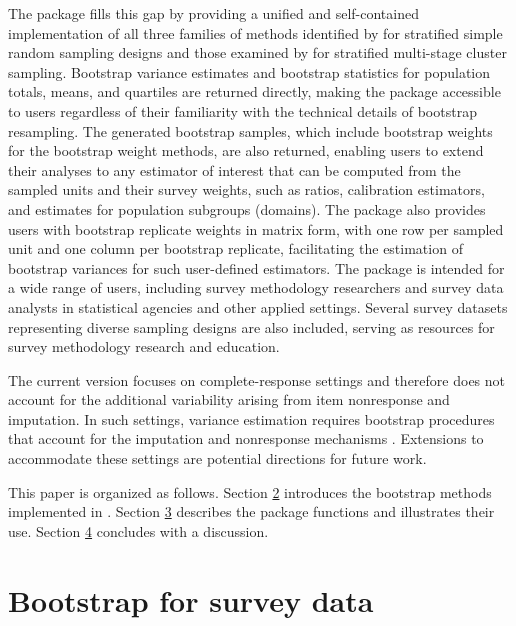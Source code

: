 The  package \citep{Mashreghi:2026} fills this gap by providing a unified and self-contained implementation of all three families of methods identified by \citet{Mashreghi:Haziza:Leger:2016} for stratified simple random sampling designs and those examined by \citet{Chen:Haziza:Mashreghi:2022} for stratified multi-stage cluster sampling. Bootstrap variance estimates and bootstrap statistics for population totals, means, and quartiles are returned directly, making the package accessible to users regardless of their familiarity with the technical details of bootstrap resampling. The generated bootstrap samples, which include bootstrap weights for the bootstrap weight methods, are also returned, enabling users to extend their analyses to any estimator of interest that can be computed from the sampled units and their survey weights, such as ratios, calibration estimators, and estimates for population subgroups (domains). The package also provides users with bootstrap replicate weights in matrix form, with one row per sampled unit and one column per bootstrap replicate, facilitating the estimation of bootstrap variances for such user-defined estimators. The package is intended for a wide range of users, including survey methodology researchers and survey data analysts in statistical agencies and other applied settings. Several survey datasets representing diverse sampling designs are also included, serving as resources for survey methodology research and education.

The current version focuses on complete-response settings and therefore does not account for the additional variability arising from item nonresponse and imputation. In such settings, variance estimation requires bootstrap procedures that account for the imputation and nonresponse mechanisms \citep{Shao:Sitter:1996, Mashreghi:Leger:Haziza:2014, Chen:Haziza:Leger:Mashreghi:2019, Chen:Haziza:Mashreghi:2021, Mashreghi:Deng:2023}. Extensions to accommodate these settings are potential directions for future work.

This paper is organized as follows. Section \hyperref[BootSurvData]{2} introduces the bootstrap methods implemented in . Section \hyperref[sec:pkgbootsurv]{3} describes the package functions and illustrates their use. Section \hyperref[sec:discussion]{4} concludes with a discussion.

\section{Bootstrap for survey data}\label{BootSurvData}

